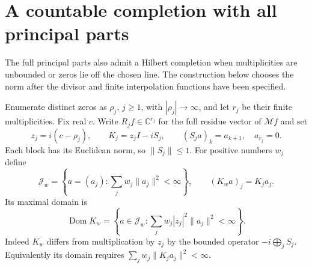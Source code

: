 \section{A countable completion with all principal parts}

The full principal parts also admit a Hilbert completion when
multiplicities are unbounded or zeros lie off the chosen line.
The construction below chooses the norm after the divisor and
finite interpolation functions have been specified.

Enumerate distinct zeros as $\rho_j$, $j\geq1$, with
$|\rho_j|\to\infty$, and let $r_j$ be their finite multiplicities.
Fix real $c$. Write $R_jf\in\mathbb C^{r_j}$ for the full residue
vector of $\mathcal Mf$ and set
\[
 z_j=i(c-\rho_j),\qquad K_j=z_jI-iS_j,
 \qquad (S_ja)_k=a_{k+1},\quad a_{r_j}=0.
\]
Each block has its Euclidean norm, so $\|S_j\|\leq1$.
For positive numbers $w_j$ define
\[
 \mathscr J_w=\left\{a=(a_j):
              \sum_jw_j\|a_j\|^2<\infty\right\},\qquad
 (K_wa)_j=K_ja_j.
\]
Its maximal domain is
\begin{equation}
 \operatorname{Dom}K_w=
 \left\{a\in\mathscr J_w:
             \sum_jw_j|z_j|^2\|a_j\|^2<\infty\right\}.
 \label{mo:full-domain}
\end{equation}
Indeed $K_w$ differs from multiplication by $z_j$ by the bounded
operator $-i\bigoplus_jS_j$. Equivalently its domain requires
$\sum_jw_j\|K_ja_j\|^2<\infty$.

